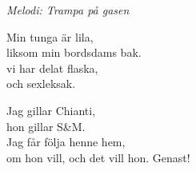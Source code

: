 {\footnotesize\textit{Melodi: Trampa på gasen}}\par
\vspace{10pt}
Min tunga är lila,\\
liksom min bordsdams bak.\\
vi har delat flaska,\\
och sexleksak.\par
\vspace{10pt}
Jag gillar Chianti,\\
hon gillar S\&M.\\
Jag får följa henne hem,\\
om hon vill, och det vill hon. Genast!
